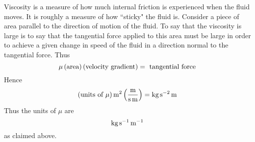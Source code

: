 Viscosity is a measure of how much internal friction is experienced when the
fluid moves. It is roughly a measure of how \textquotedblleft sticky" the
fluid is. Consider a piece of area parallel to the direction of motion of
the fluid. To say that the viscosity is large is to say that the tangential
force applied to this area must be large in order to achieve a given change
in speed of the fluid in a direction normal to the tangential force. Thus 
\begin{equation*}
\mu \left(\mbox{area}\right) \left(\mbox{velocity gradient}\right) =\mbox{
tangential force}
\end{equation*}
Hence 
\begin{equation*}
\left(\mbox{units of $\mu$} \right) \mathop{\textrm{\rm m}}\nolimits^{2}\left(\frac{\mathop{\textrm{\rm m}}\nolimits}{\mathop{\textrm{\rm s}}\nolimits \mathop{\textrm{\rm m}}\nolimits}\right)
=\mathop{\textrm{\rm kg}}\nolimits\mathop{\textrm{\rm s}}\nolimits ^{-2}\mathop{\textrm{\rm m}}\nolimits
\end{equation*}
Thus the units of $\mu $ are 
\begin{equation*}
\mathop{\textrm{\rm kg}}\nolimits\mathop{\textrm{\rm s}}\nolimits ^{-1}\mathop{\textrm{\rm m}}\nolimits^{-1}
\end{equation*}
as claimed above.

